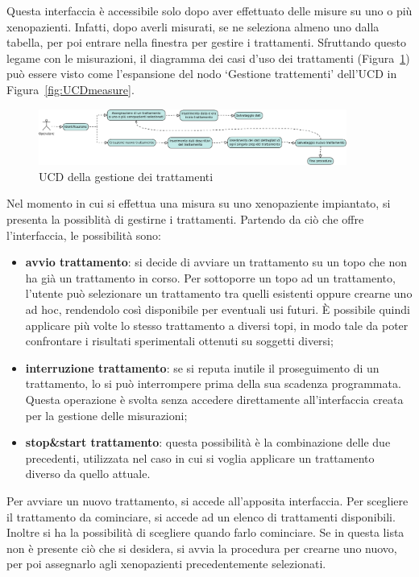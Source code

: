 Questa interfaccia \`e accessibile solo dopo aver effettuato delle misure su uno o pi\`u xenopazienti. Infatti, dopo averli misurati, se ne seleziona almeno uno dalla tabella, per poi entrare nella finestra per gestire i trattamenti. Sfruttando questo legame con le misurazioni, il diagramma dei casi d'uso dei trattamenti (Figura~\ref{fig:UCDtreat}) pu\`o essere visto come l'espansione del nodo `Gestione trattementi' dell'UCD in Figura~\ref{fig:UCDmeasure}.

\begin{figure}[h]
\begin{center}
\includegraphics[width=0.9\textwidth]{./Figure/UCDtreatments}
\end{center}
\caption{UCD della gestione dei trattamenti\label{fig:UCDtreat}}
\end{figure}

Nel momento in cui si effettua una misura su uno xenopaziente impiantato, si presenta la possiblit\`a di gestirne i trattamenti. Partendo da ci\`o che offre l'interfaccia, le possibilit\`a sono:
\begin{itemize}
	\item \textbf{avvio trattamento}: si decide di avviare un trattamento su un topo che non ha gi\`a un trattamento in corso. Per sottoporre un topo ad un trattamento, l'utente pu\`o selezionare un trattamento tra quelli esistenti oppure crearne uno ad hoc, rendendolo cos\`i disponibile per eventuali usi futuri. \`E possibile quindi applicare pi\`u volte lo stesso trattamento a diversi topi, in modo tale da poter confrontare i risultati sperimentali ottenuti su soggetti diversi;
	\item \textbf{interruzione trattamento}: se si reputa inutile il proseguimento di un trattamento, lo si pu\`o interrompere prima della sua scadenza programmata. Questa operazione \`e svolta senza accedere direttamente all'interfaccia creata per la gestione delle misurazioni;
	\item \textbf{stop\&start trattamento}: questa possibilit\`a \`e la combinazione delle due precedenti, utilizzata nel caso in cui si voglia applicare un trattamento diverso da quello attuale.
\end{itemize}

Per avviare un nuovo trattamento, si accede all'apposita interfaccia. Per scegliere il trattamento da cominciare, si accede ad un elenco di trattamenti disponibili. Inoltre si ha la possibilit\`a di scegliere quando farlo cominciare. Se in questa lista non \`e presente ci\`o che si desidera, si avvia la procedura per crearne uno nuovo, per poi assegnarlo agli xenopazienti precedentemente selezionati.

